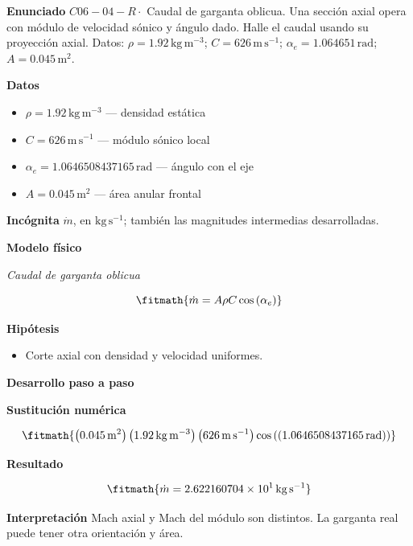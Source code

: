 \documentclass[10pt,openany]{book}
\begin{document}
\begin{tcolorbox}[title={Problema resuelto 4}, studiumworked, breakable]

\noindent\textbf{Enunciado}
\(C06-04-R \cdot\) Caudal de garganta oblicua. Una sección axial opera con módulo de velocidad sónico y ángulo dado. Halle el caudal usando su proyección axial. Datos: \(\rho=1.92\, \mathrm{kg}\,\mathrm{m}^{-3}\); \(C=626\, \mathrm{m}\,\mathrm{s}^{-1}\); \(\alpha_e=1.064651\, \mathrm{rad}\); \(A=0.045\, \mathrm{m}^{2}\).

\noindent\textbf{Datos}
\begin{itemize}
\item $\rho = 1.92\,\mathrm{kg}\,\mathrm{m}^{-3}$ — densidad estática
\item $C = 626\,\mathrm{m}\,\mathrm{s}^{-1}$ — módulo sónico local
\item $\alpha_e = 1.0646508437165\,\mathrm{rad}$ — ángulo con el eje
\item $A = 0.045\,\mathrm{m}^{2}$ — área anular frontal
\end{itemize}

\noindent\textbf{Incógnita}
$\dot{m}$, en $\mathrm{kg\,s^{-1}}$; también las magnitudes intermedias desarrolladas.

\noindent\textbf{Modelo físico}

\noindent\textit{Caudal de garganta oblicua}

\[
\fitmath{\dot m=A \rho C \cos{\left(\alpha_e \right)}}
\]

\noindent\textbf{Hipótesis}
\begin{itemize}
\item Corte axial con densidad y velocidad uniformes.
\end{itemize}

\noindent\textbf{Desarrollo paso a paso}



\noindent\textbf{Sustitución numérica}

\[
\fitmath{\left(0.045\,\mathrm{m}^{2}\right) \left(1.92\,\mathrm{kg}\,\mathrm{m}^{-3}\right) \left(626\,\mathrm{m}\,\mathrm{s}^{-1}\right) \cos{\left(\left(1.0646508437165\,\mathrm{rad}\right) \right)}}
\]

\noindent\textbf{Resultado}

\[
\fitmath{\dot m=2.622160704\times10^{1}\,\mathrm{kg}\,\mathrm{s}^{-1}}
\]

\noindent\textbf{Interpretación}
Mach axial y Mach del módulo son distintos. La garganta real puede tener otra orientación y área.


\end{tcolorbox}
\end{document}
